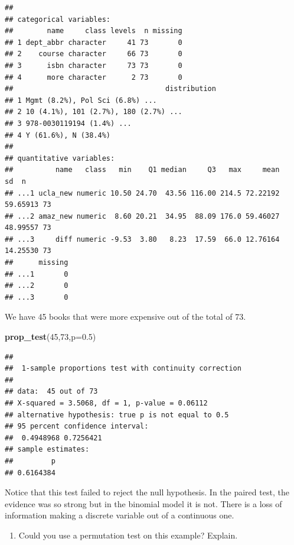 \documentclass[
]{book}
\newenvironment{Shaded}{\begin{snugshade}}{\end{snugshade}}
\newcommand{\DataTypeTok}[1]{\textcolor[rgb]{0.13,0.29,0.53}{#1}}
\newcommand{\DecValTok}[1]{\textcolor[rgb]{0.00,0.00,0.81}{#1}}
\newcommand{\FloatTok}[1]{\textcolor[rgb]{0.00,0.00,0.81}{#1}}
\newcommand{\KeywordTok}[1]{\textcolor[rgb]{0.13,0.29,0.53}{\textbf{#1}}}
\newcommand{\NormalTok}[1]{#1}
\providecommand{\tightlist}{%
  \setlength{\itemsep}{0pt}\setlength{\parskip}{0pt}}
\begin{document}
\begin{verbatim}
## 
## categorical variables:  
##        name     class levels  n missing
## 1 dept_abbr character     41 73       0
## 2    course character     66 73       0
## 3      isbn character     73 73       0
## 4      more character      2 73       0
##                                    distribution
## 1 Mgmt (8.2%), Pol Sci (6.8%) ...              
## 2 10 (4.1%), 101 (2.7%), 180 (2.7%) ...        
## 3 978-0030119194 (1.4%) ...                    
## 4 Y (61.6%), N (38.4%)                         
## 
## quantitative variables:  
##          name   class   min    Q1 median     Q3   max     mean       sd  n
## ...1 ucla_new numeric 10.50 24.70  43.56 116.00 214.5 72.22192 59.65913 73
## ...2 amaz_new numeric  8.60 20.21  34.95  88.09 176.0 59.46027 48.99557 73
## ...3     diff numeric -9.53  3.80   8.23  17.59  66.0 12.76164 14.25530 73
##      missing
## ...1       0
## ...2       0
## ...3       0
\end{verbatim}

We have 45 books that were more expensive out of the total of 73.

\begin{Shaded}
\begin{Highlighting}[]
\KeywordTok{prop_test}\NormalTok{(}\DecValTok{45}\NormalTok{,}\DecValTok{73}\NormalTok{,}\DataTypeTok{p=}\FloatTok{0.5}\NormalTok{)}
\end{Highlighting}
\end{Shaded}

\begin{verbatim}
## 
##  1-sample proportions test with continuity correction
## 
## data:  45 out of 73
## X-squared = 3.5068, df = 1, p-value = 0.06112
## alternative hypothesis: true p is not equal to 0.5
## 95 percent confidence interval:
##  0.4948968 0.7256421
## sample estimates:
##         p 
## 0.6164384
\end{verbatim}

Notice that this test failed to reject the null hypothesis. In the paired test, the evidence was so strong but in the binomial model it is not. There is a loss of information making a discrete variable out of a continuous one.

\begin{enumerate}
\def\labelenumi{\alph{enumi}.}
\setcounter{enumi}{7}
\tightlist
\item
  Could you use a permutation test on this example? Explain.
\end{enumerate}
\end{document}
